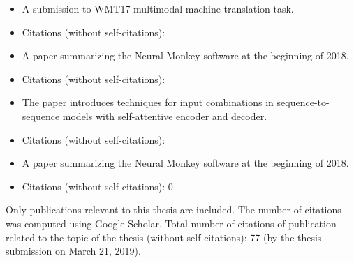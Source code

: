 
\newpage
\noindent{}
\begin{itemize}[noitemsep,topsep=0pt]

\item A submission to WMT17 multimodal machine translation task.

  \item Citations (without self-citations): 

\end{itemize}\vspace{3mm}


\noindent{}
\begin{itemize}[noitemsep,topsep=0pt]

  \item A paper summarizing the Neural Monkey software at the beginning of
      2018.

  \item Citations (without self-citations): 

\end{itemize}\vspace{3mm}


\noindent{}
\begin{itemize}[noitemsep,topsep=0pt]

  \item The paper introduces techniques for input combinations in
      sequence-to-sequence models with self-attentive encoder and decoder.

  \item Citations (without self-citations): 

\end{itemize}\vspace{3mm}


\noindent{}
\begin{itemize}[noitemsep,topsep=0pt]

  \item A paper summarizing the Neural Monkey software at the beginning of
      2018. 

  \item Citations (without self-citations): 0

\end{itemize}\vspace{3mm}

\vspace{1cm}

\noindent Only publications relevant to this thesis are included. The number of
citations was computed using Google Scholar. Total number of citations of
publication related to the topic of the thesis (without self-citations):
{\large 77} (by the thesis submission on March 21, 2019).
